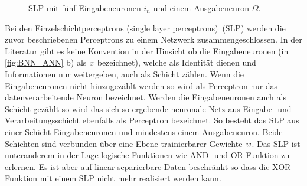 \begin{figure}[!htb]
    \caption{SLP mit fünf Eingabeneuronen $i_n$ und einem Ausgabeneuron $\Omega$.}
    \label{fig:SLP}
\end{figure}
Bei den Einzelschichtperceptrons (single layer perceptrons)~(SLP) werden die zuvor beschriebenen Perceptrons zu einem Netzwerk zusammengeschlossen. In der Literatur gibt es keine Konvention in der Hinsicht ob die Eingabeneuronen (in \autoref{fig:BNN_ANN} b) als $\text{\textit{x}}$ bezeichnet), welche als Identität dienen und Informationen nur weitergeben, auch als Schicht zählen. Wenn die Eingabeneuronen nicht hinzugezählt werden so wird als Perceptron nur das datenverarbeitende Neuron bezeichnet. Werden die Eingabeneuronen auch als Schicht gezählt so wird das sich so ergebende neuronale Netz aus Eingabe- und Verarbeitungsschicht ebenfalls als Perceptron bezeichnet. So besteht das SLP aus einer Schicht Eingabeneuronen und mindestens einem Ausgabeneuron. Beide Schichten sind verbunden über \underline{eine} Ebene trainierbarer Gewichte $\text{\textit{w}}$. Das SLP ist unteranderem in der Lage logische Funktionen wie AND- und OR-Funktion zu erlernen. Es ist aber auf linear separierbare Daten beschränkt so dass die XOR-Funktion mit einem SLP nicht mehr realisiert werden kann.


